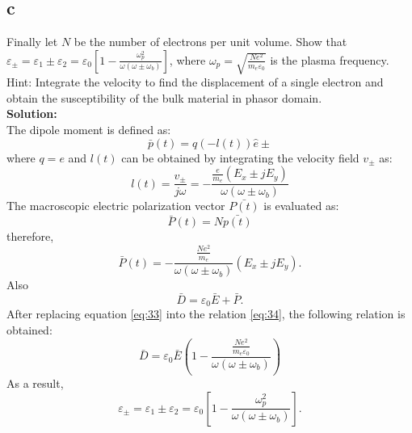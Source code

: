 \documentclass[11pt]{amsart}
\begin{document}
\subsection*{c}
Finally let $N$ be the number of electrons per unit volume. Show that $\varepsilon_{\pm}=\varepsilon_1 \pm \varepsilon_2 = \varepsilon_0 \left [ 1 - \frac{\omega_{p}^2}{\omega (\omega \pm \omega_b)}  \right ]$, where $\omega_p = \sqrt{\frac{N e^2}{m_e \varepsilon_0}}$ is the plasma frequency.
\\
Hint: Integrate the velocity to find the displacement of a single electron and obtain the
susceptibility of the bulk material in phasor domain.
\\
\textbf{Solution:}\\
The dipole moment is defined as:
\begin{equation}
\label{eq:32}
\bar{p}(t)=q (-l(t)) \hat{e}{\pm}
\end{equation}
where $q=e$ and $l(t)$ can be obtained by integrating the velocity field $v_{\pm}$ as:
\begin{equation}
l(t)=\frac{v_{\pm}}{j \omega} = -\frac{\frac{e}{m_e}(E_x \pm j E_y)}{\omega (\omega \pm \omega_b)}
\end{equation}
The macroscopic electric polarization vector $\bar{P(t)}$ is evaluated as:
\begin{equation}
\bar{P}(t)=N \bar{p(t)}
\end{equation}
therefore,
\begin{equation}
\label{eq:33}
\bar{P}(t)= -\frac{\frac{N e^2}{m_e}}{\omega (\omega \pm \omega_b)}(E_x \pm j E_y).
\end{equation}
Also
\begin{equation}
\label{eq:34}
\bar{D}=\varepsilon_0 \bar{E}+\bar{P}.
\end{equation}
After replacing equation \ref{eq:33} into the relation \ref{eq:34}, the following relation is obtained:
\begin{equation}
\bar{D}=\varepsilon_0 \bar{E}(1-\frac{\frac{N e^2}{m_e \varepsilon_0}}{\omega (\omega \pm \omega_b)})
\end{equation}
As a result,
\begin{equation}
\varepsilon_{\pm}=\varepsilon_1 \pm \varepsilon_2 = \varepsilon_0 \left [ 1 - \frac{\omega_{p}^2}{\omega (\omega \pm \omega_b)}  \right ].
\end{equation}
\end{document}
